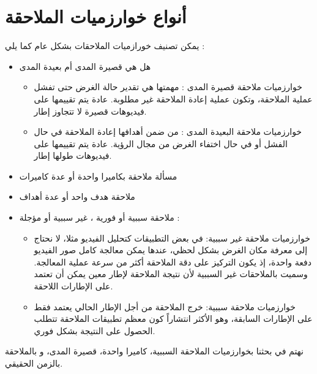 \section{أنواع خوارزميات الملاحقة}
يمكن تصنيف خورازميات الملاحقات بشكل عام كما يلي :

\begin{itemize}
	\item
هل هي قصيرة المدى أم بعيدة المدى
\begin{itemize}
\item
خوارزميات ملاحقة قصيرة المدى
:
مهمتها هي تقدير حالة الغرض
حتى تفشل عملية الملاحقة، وتكون عملية إعادة الملاحقة غير مطلوبة. عادة يتم تقييمها على فيديوهات قصيرة لا تتجاوز 
إطار.
\item
خوارزميات ملاحقة البعيدة المدى 
:
من ضمن أهدافها إعادة الملاحقة في حال الفشل أو في حال اختفاء الغرض من مجال الرؤية. عادة يتم تقييمها على فيديوهات طولها  
		  إطار.
\end{itemize}
\item مسألة ملاحقة بكاميرا واحدة أو عدة كاميرات
\item 
ملاحقة هدف واحد 
أو
 عدة أهداف
\item
ملاحقة سببية أو فورية
 ،
غير سببية أو مؤجلة
 :
\begin{itemize}
\item
خوارزميات ملاحقة غير سببية:
في بعض التطبيقات  كتحليل الفيديو مثلا، لا نحتاج إلى معرفة مكان الغرض  بشكل لحظي، عندها يمكن معالجة كامل صور  الفيديو دفعة واحدة، إذ يكون التركيز على دقة الملاحقة أكثر  من سرعة عملية المعالجة. وسميت بالملاحقات غير السببية لأن نتيجة الملاحقة لإطار معين يمكن أن تعتمد على الإطارات اللاحقة.
	
\item
خوارزميات ملاحقة سببية:
خرج الملاحقة من أجل الإطار الحالي يعتمد فقط على الإطارات السابقة، وهو الأكثر انتشاراً كون معظم تطبيقات الملاحقة تتطلب الحصول على النتيجة بشكل فوري.
	
\end{itemize}
\end{itemize}
نهتم في بحثنا بخوارزميات الملاحقة السببية، كاميرا واحدة، قصيرة المدى، و بالملاحقة بالزمن الحقيقي.
